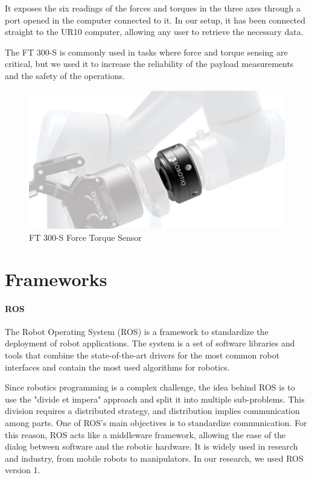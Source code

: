 It exposes the six readings of the forces and torques in the three axes through a port opened in the computer connected to it. In our setup, it has been connected straight to the UR10 computer, allowing any user to retrieve the necessary data.  

The FT 300-S is commonly used in tasks where force and torque sensing are critical, but we used it to increase the reliability of the payload measurements and the safety of the operations. 

\begin{figure}
	\centering
	\includegraphics[width=0.9\linewidth]{Images/ft_sensor.png}
	\caption{FT 300-S Force Torque Sensor}
	\label{fig:ft-sensor}
\end{figure}

\newpage
\section{Frameworks}
\paragraph{ROS}
The Robot Operating System (ROS) \cite{url:ros} is a framework to standardize the deployment of robot applications. The system is a set of software libraries and tools that combine the state-of-the-art drivers for the most common robot interfaces and contain the most used algorithms for robotics. 

Since robotics programming is a complex challenge, the idea behind ROS is to use the "divide et impera" approach and split it into multiple sub-problems. This division requires a distributed strategy, and distribution implies communication among parts. One of ROS's main objectives is to standardize communication. For this reason, ROS acts like a middleware framework, allowing the ease of the dialog between software and the robotic hardware. It is widely used in research and industry, from mobile robots to manipulators. In our research, we used ROS version 1. 


